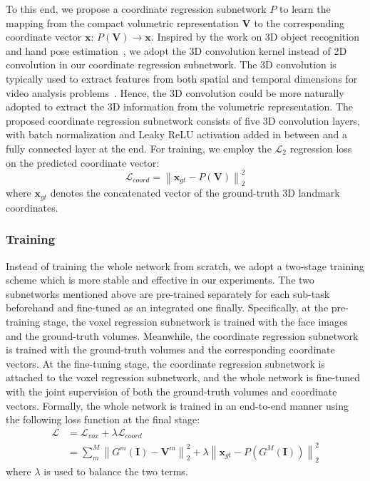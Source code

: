\documentclass[a4paper,conference]{IEEEtran}
\begin{document}
To this end, we propose a coordinate regression subnetwork $P$ to learn the mapping from the compact volumetric representation $\mathbf{V}$ to the corresponding coordinate vector $\bm{x}$:
$P(\mathbf{V})\rightarrow \bm{x}$.
Inspired by the work on 3D object recognition~\cite{wu20153d} and hand pose estimation~\cite{ge20173d}, we adopt the 3D convolution kernel instead of 2D convolution in our coordinate regression subnetwork.
The 3D convolution is typically used to extract features from both spatial and temporal dimensions for video analysis problems~\cite{ji20133d}.
Hence, the 3D convolution could be more naturally adopted to extract the 3D information from the volumetric representation.
The proposed coordinate regression subnetwork consists of five 3D convolution layers, with batch normalization and Leaky ReLU activation added in between and a fully connected layer at the end.
For training, we employ the $\mathcal{L}_2$ regression loss on the predicted coordinate vector:
\begin{equation}
{\mathcal{L}_{coord}}=\left\| {{\bm{x}}_{gt}}-P(\mathbf{V}) \right\|_{2}^{2}
\end{equation}
where $\bm{x}_{gt}$ denotes the concatenated vector of the ground-truth 3D landmark coordinates.

\subsubsection{Training}
Instead of training the whole network from scratch, we adopt a two-stage training scheme which is more stable and effective in our experiments.
The two subnetworks mentioned above are pre-trained separately for each sub-task beforehand and fine-tuned as an integrated one finally.
Specifically, at the pre-training stage, the voxel regression subnetwork is trained with the face images and the ground-truth volumes.
Meanwhile, the coordinate regression subnetwork is trained with the ground-truth volumes and the corresponding coordinate vectors.
At the fine-tuning stage, the coordinate regression subnetwork is attached to the voxel regression subnetwork, and the whole network is fine-tuned with the joint supervision of both the ground-truth volumes and coordinate vectors.
Formally, the whole network is trained in an end-to-end manner using the following loss function at the final stage:
\begin{equation}
\begin{split}
\mathcal{L}
&= \mathcal{L}_{vox} + \lambda \mathcal{L}_{coord} \\
&= \sum\limits_{m}^{M}{{{{\left\| {{G}^{m}}{{(\mathbf{I})}}-\mathbf{V}^{m} \right\|}_{2}^{2}}}} + \lambda \left\| {{\bm{x}}_{gt}}-P(G^M(\mathbf{I})) \right\|_{2}^{2}
\end{split}
\end{equation}
where $\lambda$ is used to balance the two terms.
\end{document}
